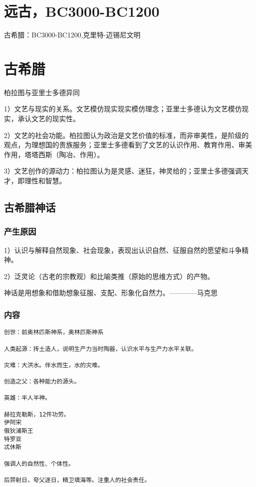 \documentclass[UTF8]{../RepresentationUniverse}
\begin{document}
\section{远古，BC3000-BC1200}

古希腊：BC3000-BC1200,克里特-迈锡尼文明


\section{古希腊}

\begin{proposition}
    柏拉图与亚里士多德异同

    1）文艺与现实的关系。文艺模仿现实现实模仿理念；亚里士多德认为文艺模仿现实，承认文艺的现实性。
    
    2）文艺的社会功能。柏拉图认为政治是文艺价值的标准，而非审美性，是阶级的观点，为理想国的贵族服务；亚里士多德看到了文艺的认识作用、教育作用、审美作用，塔塔西斯（陶冶、作用）。
    
    3）文艺创作的源动力：柏拉图认为是灵感、迷狂，神灵给的；亚里士多德强调天才，即理性和智慧。
\end{proposition}



\subsection{古希腊神话}

\subsubsection{产生原因}

1）认识与解释自然现象、社会现象，表现出认识自然、征服自然的愿望和斗争精神。

2）泛灵论（古老的宗教观）和比喻类推（原始的思维方式）的产物。

神话是用想象和借助想象征服、支配、形象化自然力。————马克思


\subsubsection{内容}

\begin{lstlisting}
创世：前奥林匹斯神系，奥林匹斯神系

人类起源：抟土造人，说明生产力当时陶器，认识水平与生产力水平关联。

灾难：大洪水。伴水而生，水的灾难。

创造之父：各种能力的源头。

英雄：半人半神。

赫拉克勒斯，12件功劳。
伊阿宋
俄狄浦斯王
特罗亚
忒休斯

强调人的自然性、个体性。

后羿射日，夸父逐日，精卫填海等。注重人的社会责任。
\end{lstlisting}
\end{document}
